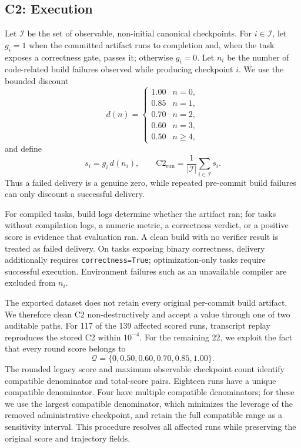 \subsection{C2: Execution}

Let $\mathcal I$ be the set of observable, non-initial canonical checkpoints.  For $i\in\mathcal I$, let $g_i=1$ when the committed artifact runs to completion and, when the task exposes a correctness gate, passes it; otherwise $g_i=0$.  Let $n_i$ be the number of code-related build failures observed while producing checkpoint $i$.  We use the bounded discount
\[
  d(n)=
  \begin{cases}
    1.00 & n=0,\\
    0.85 & n=1,\\
    0.70 & n=2,\\
    0.60 & n=3,\\
    0.50 & n\ge4,
  \end{cases}
\]
and define
\[
  s_i=g_i\,d(n_i),\qquad
  \mathrm{C2}_{\mathrm{run}}=
  \frac{1}{|\mathcal I|}\sum_{i\in\mathcal I}s_i.
\]
Thus a failed delivery is a genuine zero, while repeated pre-commit build failures can only discount a successful delivery.

For compiled tasks, build logs determine whether the artifact ran; for tasks without compilation logs, a numeric metric, a correctness verdict, or a positive score is evidence that evaluation ran.  A clean build with no verifier result is treated as failed delivery.  On tasks exposing binary correctness, delivery additionally requires \texttt{correctness=True}; optimization-only tasks require successful execution.  Environment failures such as an unavailable compiler are excluded from $n_i$.

The exported dataset does not retain every original per-commit build artifact.  We therefore clean C2 non-destructively and accept a value through one of two auditable paths.  For 117 of the 139 affected scored runs, transcript replay reproduces the stored C2 within $10^{-4}$.  For the remaining 22, we exploit the fact that every round score belongs to
\[
  \mathcal Q=\{0,0.50,0.60,0.70,0.85,1.00\}.
\]
The rounded legacy score and maximum observable checkpoint count identify compatible denominator and total-score pairs.  Eighteen runs have a unique compatible denominator.  Four have multiple compatible denominators; for these we use the largest compatible denominator, which minimizes the leverage of the removed administrative checkpoint, and retain the full compatible range as a sensitivity interval.  This procedure resolves all affected runs while preserving the original score and trajectory fields.

